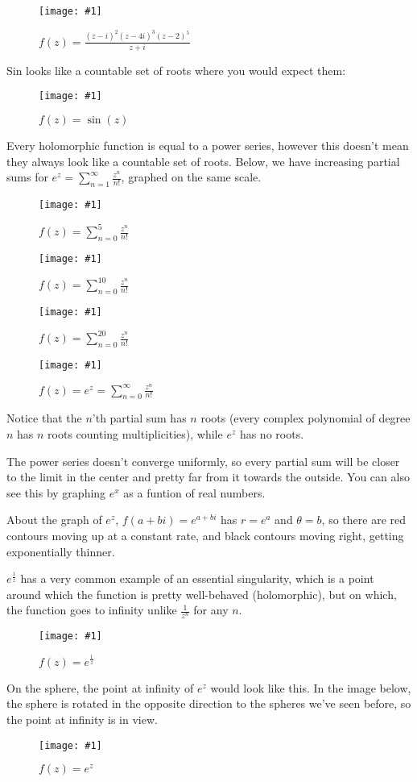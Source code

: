 \documentclass[xhtml, mathjax]{article}
\newcommand{\singleimage}[2] {
  \begin{figure}
    \centering
    \texttt{[image: \#1]}\par
    #2
  \end{figure}
}
\begin{document}
    \singleimage{poly_6.gif}{$f(z)=\frac{(z-i)^2(z-4i)^3(z-2)^5}{z+i}$}

    Sin looks like a countable set of roots where you would expect them:

    \singleimage{sin.gif}{$f(z)=\sin(z)$}

    Every holomorphic function is equal to a power series, however this doesn't
    mean they always look like a countable set of roots. Below, we have
    increasing partial sums for $e^z = \sum_{n=1}^\infty \frac{z^n}{n!}$,
    graphed on the same scale.

    \singleimage{exp_sum_to_5.gif}{$f(z) = \sum_{n=0}^5 \frac{z^n}{n!}$}

    \singleimage{exp_sum_to_10.gif}{$f(z) = \sum_{n=0}^{10} \frac{z^n}{n!}$}

    \singleimage{exp_sum_to_20.gif}{$f(z) = \sum_{n=0}^{20} \frac{z^n}{n!}$}

    \singleimage{exp.gif}{$f(z) = e^z = \sum_{n=0}^\infty \frac{z^n}{n!}$}

    Notice that the $n$'th partial sum has $n$ roots (every complex polynomial
    of degree $n$ has $n$ roots counting multiplicities), while $e^z$ has no
    roots.

    The power series doesn't converge uniformly, so every partial sum will be
    closer to the limit in the center and pretty far from it towards the
    outside. You can also see this by graphing $e^x$ as a funtion of real
    numbers.

    About the graph of $e^z$, $f(a+bi) = e^{a+bi}$ has $r = e^a$ and
    $\theta = b$, so there are red contours moving up at a constant rate, and
    black contours moving right, getting exponentially thinner.

    $e^{\frac{1}{z}}$ has a very common example of an essential singularity,
    which is a point around which the function is pretty well-behaved
    (holomorphic), but on which, the function goes to infinity unlike
    $\frac{1}{z^n}$ for any $n$.

    \singleimage{exp_inv.gif}{$f(z)=e^{\frac{1}{z}}$}

    On the sphere, the point at infinity of $e^z$ would look like this. In the
    image below, the sphere is rotated in the opposite direction to the spheres
    we've seen before, so the point at infinity is in view.

    \singleimage{exp_inv_sphere.gif}{$f(z)=e^{z}$}

\end{document}
